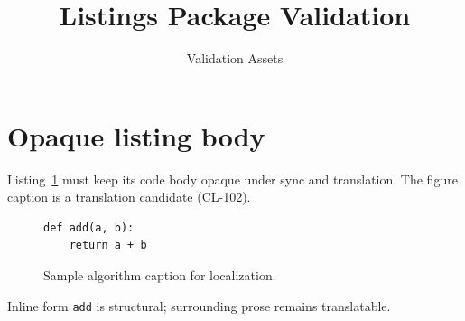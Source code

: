 \documentclass[11pt]{article}
\title{Listings Package Validation}
\author{Validation Assets}
\date{}
\begin{document}
\maketitle

\section{Opaque listing body}
\label{sec:listings}

Listing~\ref{lst:demo} must keep its code body opaque under sync and
translation. The figure caption is a translation candidate (CL-102).

\begin{figure}[ht]
\begin{lstlisting}
def add(a, b):
    return a + b
\end{lstlisting}
\caption{Sample algorithm caption for localization.}
\label{lst:demo}
\end{figure}

Inline form \lstinline|add| is structural; surrounding prose remains
translatable.
\end{document}
